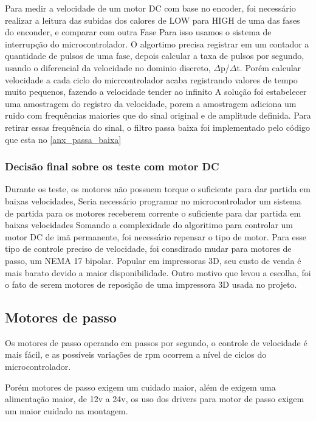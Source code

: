 
Para medir a velocidade de um motor DC com base no encoder, foi necessário realizar a leitura das subidas dos calores de LOW para HIGH de uma das fases do enconder, e comparar com outra Fase
Para isso usamos o sistema de interrupção do microcontrolador.
O algortimo precisa registrar em um contador a quantidade de pulsos de uma fase, 
depois calcular a taxa de pulsos por segundo, usando o diferencial da velocidade no dominio discreto, $\Delta$p/$\Delta$t.
Porém calcular velocidade a cada ciclo do micrcontrolador acaba registrando valores de tempo muito pequenos, fazendo a velocidade tender ao infinito
A solução foi estabelecer uma amostragem do registro da velocidade, porem a amostragem adiciona um ruido com frequências maiories que do sinal original e de amplitude definida.
Para retirar essas frequência do sinal, o filtro passa baixa foi implementado pelo código que esta no \ref{anx_passa_baixa}


\subsubsection{Decisão final sobre os teste com motor DC}

Durante os teste, os motores não possuem torque o suficiente para dar partida em baixas velocidades,
Seria necessário programar no microcontrolador um sistema de partida para os motores receberem corrente o suficiente
para dar partida em baixas velocidades
Somando a complexidade do algoritimo para controlar um motor DC de imã permanente, foi necessário repensar o tipo de motor.
Para esse tipo de controle preciso de velocidade, foi consdirado mudar para motores de passo, um NEMA 17 bipolar.
Popular em impressoras 3D, seu custo de venda é mais barato devido a maior disponibilidade.
Outro motivo que levou a escolha, foi o fato de serem motores de reposição de uma impressora 3D usada no projeto.

\subsection{Motores de passo}

Os motores de passo operando em passos por segundo, o controle de velocidade é mais fácil,
e as possíveis variações de rpm ocorrem a nível de ciclos do microcontrolador.

Porém motores de passo exigem um cuidado maior, além de exigem uma alimentação maior, de 12v a 24v, os uso dos drivers para motor de passo exigem um maior cuidado na montagem.

